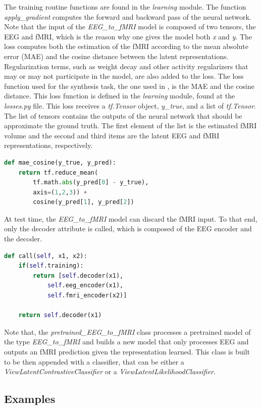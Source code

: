 The training routine functions are found in the \textit{learning} module. The function \textit{apply\_gradient} computes the forward and backward pass of the neural network. Note that the input of the \textit{EEG\_to\_fMRI} model is composed of two tensors, the EEG and fMRI, which is the reason why one gives the model both \textit{x} and \textit{y}. The loss computes both the estimation of the fMRI according to the mean absolute error (MAE) and the cosine distance between the latent representations. Regularization terms, such as weight decay and other activity regularizers that may or may not participate in the model, are also added to the loss. The loss function used for the synthesis task, the one used in \citep{calhas2022eeg}, is the MAE and the cosine distance. This loss function is defined in the \textit{learning} module, found at the \textit{losses.py} file. This loss receives a \textit{tf.Tensor} object, \textit{y\_true}, and a list of \textit{tf.Tensor}. The list of tensors contains the outputs of the neural network that should be approximate the ground truth. The first element of the list is the estimated fMRI volume and the second and third items are the latent EEG and fMRI representations, respectively.
\begin{lstlisting}[language=python]
def mae_cosine(y_true, y_pred):
    return tf.reduce_mean(
        tf.math.abs(y_pred[0] - y_true),
        axis=(1,2,3)) +
        cosine(y_pred[1], y_pred[2])
\end{lstlisting}
At test time, the \textit{EEG\_to\_fMRI} model can discard the fMRI input. To that end, only the decoder attribute is called, which is composed of the EEG encoder and the decoder.
\begin{lstlisting}[language=python]
def call(self, x1, x2):
    if(self.training):
        return [self.decoder(x1),
            self.eeg_encoder(x1),
            self.fmri_encoder(x2)]

    return self.decoder(x1)
\end{lstlisting}
Note that, the \textit{pretrained\_EEG\_to\_fMRI} class processes a pretrained model of the type \textit{EEG\_to\_fMRI} and builds a new model that only processes EEG and outputs an fMRI prediction given the representation learned. This class is built to be then appended with a classifier, that can be either a \textit{ViewLatentContrastiveClassifier} or a \textit{ViewLatentLikelihoodClassifier}.

\subsection{Examples}\label{section:examples}

